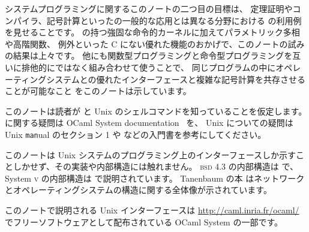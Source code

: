 システムプログラミングに関するこのノートの二つ目の目標は、
定理証明やコンパイラ、記号計算といった\ocaml の一般的な応用とは異なる分野における \ocaml の利用例を見せることです。
\ocaml の持つ強固な命令的カーネルに加えてパラメトリック多相や高階関数、
例外といった C にない優れた機能のおかげで、このノートの試みの結果は上々です。
他にも関数型プログラミングと命令型プログラミングを互いに排他的にではなく組み合わせて使うことで、
同じプログラムの中にオペレーティングシステムとの優れたインターフェースと複雑な記号計算を共存させることが可能なこと
をこのノートは示しています。

このノートは読者が \ocaml と Unix のシェルコマンドを知っていることを仮定します。
\ocaml に関する疑問は OCaml System documentation~\cite{OCaml} を、 Unix についての疑問は Unix \texttt{man}ual のセクション 1 や \cite{KP,R1} などの入門書を参考にしてください。


このノートは Unix システムのプログラミング上のインターフェースしか示すことしかせず、その実装や内部構造には触れません。
\textsc{bsd} 4.3 の内部構造は \cite{BSD} で、 System \textsc{v} の内部構造は \cite{Bach} で説明されています。
Tanenbaum の本 \cite{T1, T2} はネットワークとオペレーティングシステムの構造に関する全体像が示されています。

このノートで説明される Unix インターフェースは \url{http://caml.inria.fr/ocaml/} でフリーソフトウェアとして配布されている OCaml System の一部です。
